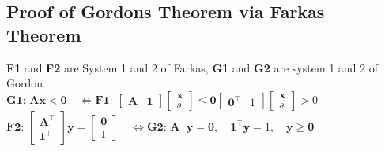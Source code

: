 \documentclass[english]{latex4ei/latex4ei_sheet}
\begin{document}
\begin{sectionbox}
	\subsection{Proof of Gordons Theorem via Farkas Theorem}
	
	\textbf{F1} and \textbf{F2} are System 1 and 2 of Farkas, \textbf{G1} and \textbf{G2} are system 1 and 2 of Gordon. \\
	
	$\textbf{G1: } \bm{A}\bm{x} < \bm{0} \quad \iff \textbf{F1: } \begin{bmatrix}
		\bm{A} & \bm{1}
	\end{bmatrix} \begin{bmatrix}
		\bm{x} \\
		s
	\end{bmatrix} \leq \bm{0} \begin{bmatrix}
			\bm{0}^\intercal & 1
	\end{bmatrix} \begin{bmatrix}
			\bm{x} \\
			s
	\end{bmatrix} > 0$ \\
	$\textbf{F2: } \begin{bmatrix}
		\bm{A}^\intercal \\
		\bm{1}^\intercal
	\end{bmatrix} \bm{y} = \begin{bmatrix}
		\bm{0} \\
		1
\end{bmatrix} \quad \iff \textbf{G2: } \bm{A}^\intercal\bm{y} = \bm{0}, \quad \bm{1}^\intercal\bm{y} = 1, \quad \bm{y} \geq \bm{0}$
	
\end{sectionbox}
\end{document}
